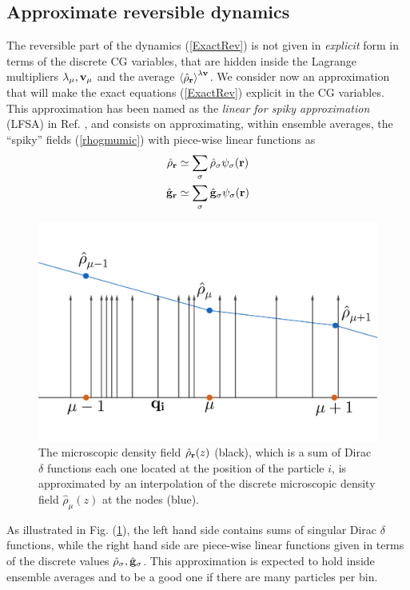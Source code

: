 \documentclass[b5paper,openright,10pt]{book}
\newcommand{\llangle}{\left\langle}
\newcommand{\rrangle}{\right\rangle}
\begin{document}
\subsection{Approximate reversible dynamics}
The reversible part  of the dynamics (\ref{ExactRev}) is  not given in
\textit{explicit} form in terms of the discrete CG variables, that are
hidden inside  the Lagrange multipliers $\lambda_\mu,{\bf  v}_\mu$ and
the  average $\llangle  \hat{\rho}_{\bf r}\rrangle^{\lambda{\bf  v}}$.
We consider  now an approximation  that will make the  exact equations
(\ref{ExactRev}) explicit in the CG variables.  This approximation has
been named  as the \textit{linear  for spiky approximation}  (LFSA) in
Ref.   \cite{Donev},  and  consists on  approximating,  within  ensemble
averages,  the ``spiky''  fields (\ref{rhogmumic})  with piece-wise
linear functions as 
\begin{align}
  \hat{\rho}_{\bf r}&\simeq \sum_\sigma\hat{\rho}_{\sigma} \psi_\sigma({\bf r})
\nonumber\\
  \hat{\bf g}_{\bf r} &\simeq \sum_\sigma\hat{\bf g}_{\sigma} \psi_\sigma({\bf r})
\label{LFSA}
\end{align}
\begin{figure}
    \centering
    \includegraphics[scale=0.2]{spiky}
    \caption[Visual representation of the ``spiky'' aproximation]{The microscopic density field $\hat{\rho}_{\bf r}{\bf}(z)$ (black), which is a sum of Dirac $\delta$ functions each one located at the position of the particle $i$, is approximated by an interpolation of the discrete microscopic density field $\hat{\rho}_{\mu}(z)$ at the nodes (blue).}
    \label{fig:spiky}
\end{figure}
As illustrated in Fig. (\ref{fig:spiky}), the left  hand side contains  sums of singular Dirac  $\delta$ functions,
while the  right hand  side are piece-wise  linear functions  given in
terms   of   the  discrete   values   $\hat{\rho}_{\sigma} ,\hat{\bf
  g}_\sigma $.   This  approximation  is  expected  to  hold  inside
ensemble averages and to be a good one if there are many particles per
bin. 
\end{document}
